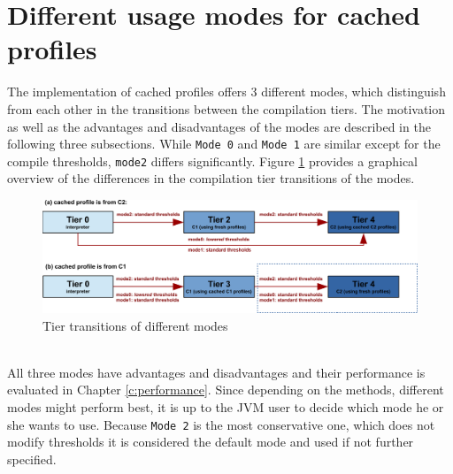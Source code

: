 \section{Different usage modes for cached profiles}
\label{s:cacheprofilesmode}
The implementation of cached profiles offers 3 different modes, which distinguish from each other in the transitions between the compilation tiers.
The motivation as well as the advantages and disadvantages of the modes are described in the following three subsections.
While \texttt{Mode 0} and \texttt{Mode 1} are similar except for the compile thresholds, \texttt{mode2} differs significantly.
Figure \ref{f:hs_tiers_thresholds} provides a graphical overview of the differences in the compilation tier transitions of the modes.
\begin{figure}[h]
  \begin{center}
    \centering
    \includegraphics{figures/hs_tiers_threshold.png}
    \caption{Tier transitions of different modes}
    \label{f:hs_tiers_thresholds}
  \end{center}
\end{figure}\\
All three modes have advantages and disadvantages and their performance is evaluated in Chapter \ref{c:performance}. Since depending on the methods, different modes might perform best, it is up to the JVM user to decide which mode he or she wants to use. Because \texttt{Mode 2} is the most conservative one, which does not modify thresholds it is considered the default mode and used if not further specified.

